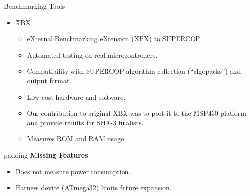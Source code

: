 \documentclass[xcolor=pdftex,dvipsnames,table,final]{beamer}
\begin{document}
\begin{frame}[fragile]{}
\begin{columns}[t, totalwidth=\textwidth]
\begin{column}{.31\linewidth}
\begin{block}{Benchmarking Tools}
        \begin{itemize}
          \item XBX
            \begin{itemize}
              \item eXternal Benchmarking eXtension (XBX) to SUPERCOP
              \item Automated testing on real microcontrollers.
              \item Compatibility with SUPERCOP algorithm collection (``algopacks'') and output format.
              \item Low cost hardware and software.
              \item Our contribution to original XBX was to port it to the MSP430
                  platform and provide results for SHA-3 finalists..
              \item Measures ROM and RAM usage. %
            \end{itemize}
        \end{itemize}
        \begin{center}
        \begin{minipage}[t]{0.9\linewidth}  
        \begin{beamercolorbox}[rounded=true]{padding}
          \textbf{Missing Features}\small
          \begin{itemize}
            \item Does not measure power consumption.
            \item Harness device (ATmega32) limits future expansion.
          \end{itemize}
        \end{beamercolorbox}
        \end{minipage}
        \end{center}


\end{block}
\end{column}
\end{columns}
\end{frame}
\end{document}
